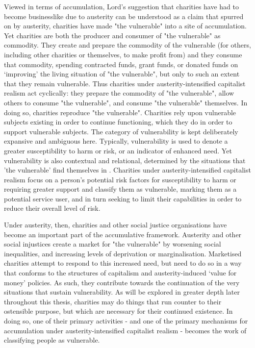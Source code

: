 Viewed in terms of accumulation, Lord's suggestion that charities have had to become businesslike due to austerity can be understood as a claim that spurred on by austerity, charities have made "the vulnerable" into a site of accumulation. Yet charities are both the producer and consumer of "the vulnerable" as commodity. They create and prepare the commodity of the vulnerable (for others, including other charities or themselves, to make profit from) and they consume that commodity, spending contracted funds, grant funds, or donated funds on `improving' the living situation of "the vulnerable", but only to such an extent that they remain vulnerable. Thus charities under austerity-intensified capitalist realism act cyclically: they prepare the commodity of "the vulnerable", allow others to consume "the vulnerable", and consume "the vulnerable" themselves. In doing so, charities reproduce "the vulnerable". Charities rely upon vulnerable subjects existing in order to continue functioning, which they do in order to support vulnerable subjects. The category of vulnerability is kept deliberately expansive and ambiguous here. Typically, vulnerability is used to denote a greater susceptibility to harm or risk, or an indicator of enhanced need. Yet vulnerability is also contextual and relational, determined by the situations that 'the vulnerable' find themselves in \citep{aldridge_working_2014}. Charities under austerity-intensified capitalist realism focus on a person's potential risk factors for susceptibility to harm or requiring greater support and classify them as vulnerable, marking them as a potential service user, and in turn seeking to limit their capabilities in order to reduce their overall level of risk. 

Under austerity, then, charities and other social justice organisations have become an important part of the accumulative framework. Austerity and other social injustices create a market for "the vulnerable" by worsening social inequalities, and increasing levels of deprivation or marginalisation. Marketised charities attempt to respond to this increased need, but need to do so in a way that conforms to the structures of capitalism and austerity-induced `value for money' policies. As such, they contribute towards the continuation of the very situations that sustain vulnerability. As will be explored in greater depth later throughout this thesis, charities may do things that run counter to their ostensible purpose, but which are necessary for their continued existence. In doing so, one of their primary activities - and one of the primary mechanisms for accumulation under austerity-intensified capitalist realism - becomes the work of classifying people as vulnerable.

